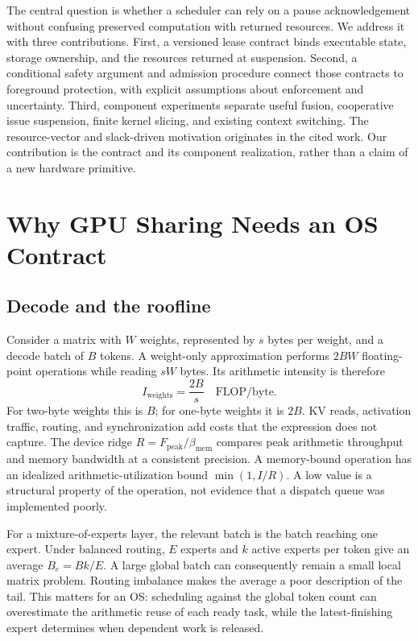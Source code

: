 The central question is whether a scheduler can rely on a pause
acknowledgement without confusing preserved computation with returned
resources. We address it with three contributions. First, a versioned lease
contract binds executable state, storage ownership, and the resources returned
at suspension. Second, a conditional safety argument and admission procedure
connect those contracts to foreground protection, with explicit assumptions
about enforcement and uncertainty. Third, component experiments separate
useful fusion, cooperative issue suspension, finite kernel slicing, and
existing context switching. The resource-vector and slack-driven motivation
originates in the cited work. Our contribution is the contract and its
component realization, rather than a claim of a new hardware primitive.

\section{Why GPU Sharing Needs an OS Contract}
\label{sec:motivation}
\subsection{Decode and the roofline}
Consider a matrix with $W$ weights, represented by $s$ bytes per weight, and
a decode batch of $B$ tokens. A weight-only approximation performs $2BW$
floating-point operations while reading $sW$ bytes. Its arithmetic intensity
is therefore
\begin{equation}
 I_{\mathrm{weights}} = \frac{2B}{s}\quad\text{FLOP/byte}.
\end{equation}
For two-byte weights this is $B$; for one-byte weights it is $2B$. KV reads,
activation traffic, routing, and synchronization add costs that the expression
does not capture. The device ridge $R=F_{\mathrm{peak}}/\beta_{\mathrm{mem}}$
compares peak arithmetic throughput and memory bandwidth at a consistent
precision. A memory-bound operation has an idealized arithmetic-utilization
bound $\min(1,I/R)$. A low value is a structural property of the operation,
not evidence that a dispatch queue was implemented poorly.

For a mixture-of-experts layer, the relevant batch is the batch reaching one
expert. Under balanced routing, $E$ experts and $k$ active experts per token
give an average $B_e=Bk/E$. A large global batch can consequently remain a
small local matrix problem. Routing imbalance makes the average a poor
description of the tail. This matters for an OS: scheduling against the
global token count can overestimate the arithmetic reuse of each ready task,
while the latest-finishing expert determines when dependent work is released.

